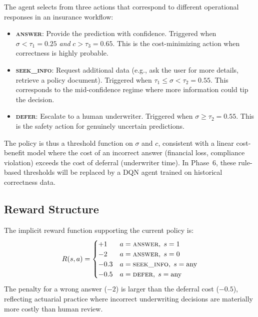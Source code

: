 \documentclass[conference]{IEEEtran}
\begin{document}
The agent selects from three actions that correspond to different
operational responses in an insurance workflow:
\begin{itemize}[leftmargin=*]
    \item \textbf{\textsc{answer}}: Provide the prediction with
          confidence. Triggered when
          $\sigma < \tau_1 = 0.25$ \emph{and}
          $c > \tau_3 = 0.65$. This is the cost-minimizing action
          when correctness is highly probable.
    \item \textbf{\textsc{seek\_info}}: Request additional data
          (e.g., ask the user for more details, retrieve a policy
          document). Triggered when
          $\tau_1 \le \sigma < \tau_2 = 0.55$. This corresponds to
          the mid-confidence regime where more information could tip
          the decision.
    \item \textbf{\textsc{defer}}: Escalate to a human underwriter.
          Triggered when $\sigma \ge \tau_2 = 0.55$. This is the
          safety action for genuinely uncertain predictions.
\end{itemize}

The policy is thus a threshold function on $\sigma$ and $c$,
consistent with a linear cost-benefit model where the cost of an
incorrect answer (financial loss, compliance violation) exceeds the
cost of deferral (underwriter time). In Phase~6, these rule-based
thresholds will be replaced by a DQN agent trained on historical
correctness data.

\subsection{Reward Structure}

The implicit reward function supporting the current policy is:
\begin{equation}
    R(s,a) =
    \begin{cases}
        +1   & a=\textsc{answer},\; s=1 \\
        -2   & a=\textsc{answer},\; s=0 \\
        -0.3 & a=\textsc{seek\_info},\; s=\text{any} \\
        -0.5 & a=\textsc{defer},\; s=\text{any}
    \end{cases}
    \label{eq:reward}
\end{equation}
The penalty for a wrong answer ($-2$) is larger than the deferral
cost ($-0.5$), reflecting actuarial practice where incorrect
underwriting decisions are materially more costly than human review.
\end{document}

